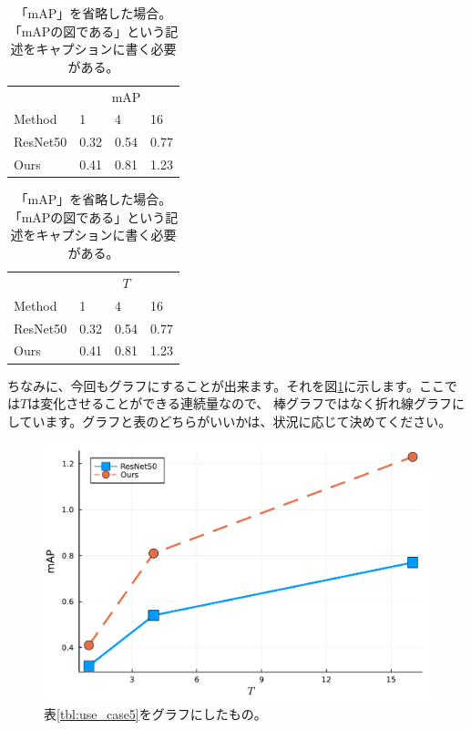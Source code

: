 \documentclass[uplatex,onecolumn,9pt,dvipdfmx]{jsarticle}
\newcommand{\Tref}[1]{表\ref{#1}}
\newcommand{\Fref}[1]{図\ref{#1}}
\begin{document}
\begin{table}[h]
    \begin{minipage}{0.48\linewidth}
        \centering
        \begin{tabular}{@{}llll@{}} \toprule
            & \multicolumn{3}{c}{mAP} \\ \cmidrule(l){2-4}
            Method & 1 & 4 & 16 \\ \midrule
            ResNet50  & 0.32 & 0.54 & 0.77 \\ 
            Ours      & 0.41 & 0.81 & 1.23 \\ \bottomrule   
        \end{tabular}
        \caption{「$T=$」を省略した場合。ここでは1, 4, 16の意味が通じなくなってしまっており、よくない表になっている。}
        \label{tbl:use_case6}
    \end{minipage}
    \hfill
    \begin{minipage}{0.48\linewidth}
        \centering
        \begin{tabular}{@{}llll@{}} \toprule
            & \multicolumn{3}{c}{$T$} \\ \cmidrule(l){2-4}
            Method & 1 & 4 & 16 \\ \midrule
            ResNet50  & 0.32 & 0.54 & 0.77 \\ 
            Ours      & 0.41 & 0.81 & 1.23 \\ \bottomrule   
        \end{tabular}
        \caption{「mAP」を省略した場合。「mAPの図である」という記述をキャプションに書く必要がある。}
        \label{tbl:use_case7}
    \end{minipage}
\end{table}

ちなみに、今回もグラフにすることが出来ます。それを\Fref{fig:use_case}に示します。ここでは$T$は変化させることができる連続量なので、
棒グラフではなく折れ線グラフにしています。グラフと表のどちらがいいかは、状況に応じて決めてください。

\begin{figure}[h]
    \centering
    \includegraphics[width=0.5\linewidth]{script/use_case.pdf}
    \caption{\Tref{tbl:use_case5}をグラフにしたもの。}
    \label{fig:use_case}
\end{figure}
\end{document}
